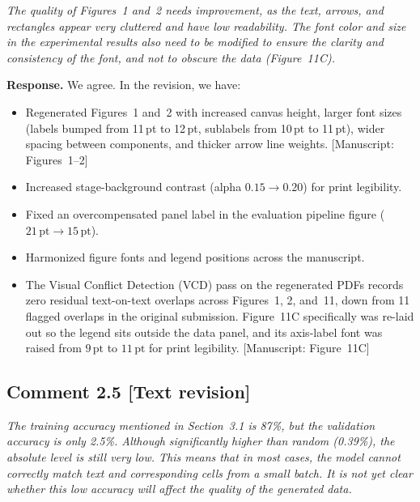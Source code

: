 \documentclass[11pt,letterpaper]{article}
\newcommand{\statustext}{\textcolor{statusblue}{\textbf{[Text revision]}}}
\newcommand{\msref}[1]{\textcolor{blue!60!black}{\textsf{[Manuscript: #1]}}}
\begin{document}
\begin{reviewercomment}
\itshape
The quality of Figures~1 and~2 needs improvement, as the text, arrows, and rectangles appear very cluttered and have low readability. The font color and size in the experimental results also need to be modified to ensure the clarity and consistency of the font, and not to obscure the data (Figure~11C).
\end{reviewercomment}

\noindent\textbf{Response.}
We agree. In the revision, we have:
\begin{itemize}
  \item Regenerated Figures~1 and~2 with increased canvas height, larger font sizes (labels bumped from 11\,pt to 12\,pt, sublabels from 10\,pt to 11\,pt), wider spacing between components, and thicker arrow line weights. \msref{Figures~1--2}
  \item Increased stage-background contrast (alpha $0.15 \to 0.20$) for print legibility.
  \item Fixed an overcompensated panel label in the evaluation pipeline figure ($21\,\text{pt} \to 15\,\text{pt}$).
  \item Harmonized figure fonts and legend positions across the manuscript.
  \item The Visual Conflict Detection (VCD) pass on the regenerated PDFs records zero residual text-on-text overlaps across Figures~1, 2, and~11, down from 11 flagged overlaps in the original submission. Figure~11C specifically was re-laid out so the legend sits outside the data panel, and its axis-label font was raised from $9\,\text{pt}$ to $11\,\text{pt}$ for print legibility. \msref{Figure~11C}
\end{itemize}

\medskip

\subsection*{Comment 2.5 \hfill \statustext}

\begin{reviewercomment}
\itshape
The training accuracy mentioned in Section~3.1 is 87\%, but the validation accuracy is only 2.5\%. Although significantly higher than random (0.39\%), the absolute level is still very low. This means that in most cases, the model cannot correctly match text and corresponding cells from a small batch. It is not yet clear whether this low accuracy will affect the quality of the generated data.
\end{reviewercomment}
\end{document}
